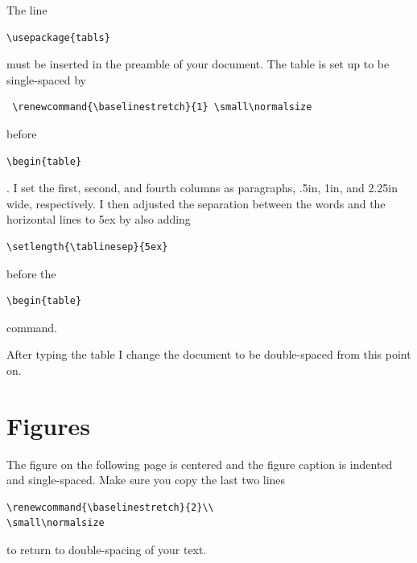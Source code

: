 \renewcommand{\baselinestretch}{2}
\small\normalsize

The line \begin{verbatim}\usepackage{tabls}\end{verbatim} must be inserted in the preamble of your document.
The table is set up to be single-spaced by \begin{verbatim} \renewcommand{\baselinestretch}{1} \small\normalsize\end{verbatim} before \begin{verbatim}\begin{table}\end{verbatim}.  I set the first, second, and fourth columns as paragraphs, .5in, 1in, and 2.25in wide, respectively.  I then adjusted the separation between the words and the horizontal lines to 5ex by also adding \begin{verbatim}\setlength{\tablinesep}{5ex}\end{verbatim} before the \begin{verbatim}\begin{table}\end{verbatim} command.

After typing the table I change the document to be double-spaced from this point on.


\newpage

\section{Figures}

The figure on the following page is centered and the figure caption is indented and single-spaced.  Make sure you copy the last two lines \begin{verbatim}
\renewcommand{\baselinestretch}{2}\\
\small\normalsize\end{verbatim} to return to double-spacing of your text.

